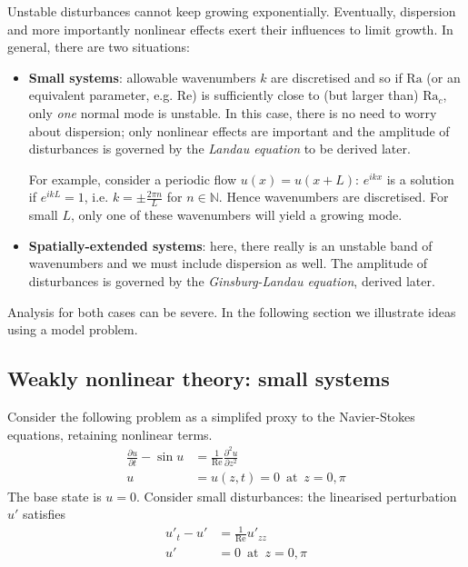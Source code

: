 \documentclass{jknotes}
\newcommand{\Ra}{\text{Ra}}
\newcommand{\ReN}{\text{Re}}
\begin{document}
Unstable disturbances cannot keep growing exponentially. Eventually,
dispersion and more importantly nonlinear effects exert their influences to
limit growth. In general, there are two situations:
\begin{itemize}
	\item \textbf{Small systems}: allowable wavenumbers $k$ are discretised
		and so if $\Ra$ (or an equivalent parameter, e.g. $\ReN$) is
		sufficiently close to (but larger than) $\Ra_c$, only \emph{one}
		normal mode is unstable.  In this case, there is no need to worry
		about dispersion; only nonlinear effects are important and the
		amplitude of disturbances is governed by the \emph{Landau equation} to
		be derived later.

		For example, consider a periodic flow $u(x) = u(x+L)$: $e^{ikx}$ is a
		solution if $e^{ikL} = 1$, i.e. $k = \pm \frac{2\pi n}{L}$ for $n \in
		\mathbb{N}$. Hence wavenumbers are discretised. For small $L$, only
		one of these wavenumbers will yield a growing mode.
		\begin{center}
		\end{center}
	\item \textbf{Spatially-extended systems}: here, there really is an
		unstable band of wavenumbers and we must include dispersion as well.
		The amplitude of disturbances is governed by the \emph{Ginsburg-Landau
		equation}, derived later.
\end{itemize}

Analysis for both cases can be severe. In the following section we illustrate
ideas using a model problem.

\subsection{Weakly nonlinear theory: small systems}
Consider the following problem as a simplifed proxy to the Navier-Stokes
equations, retaining nonlinear terms. 
\begin{align}
	\frac{\partial u}{\partial t} - \sin u &= \frac{1}{\ReN} \frac{\partial^2
	u}{\partial z^2} \label{eq:l15:1}\\
		u &= u(z,t) = 0 \,\,\,\text{at}\,\,\, z=0,\pi
\end{align}
The base state is $u=0$. Consider small disturbances: the linearised
perturbation $u'$ satisfies
\begin{align}
	u'_t - u' &= \frac{1}{\ReN} u'_{zz} \\
	u' &= 0 \,\,\,\text{at}\,\,\,z=0,\pi
\end{align}
\end{document}
